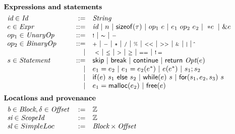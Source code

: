\begin{figure}[H]
    \[\def\arraystretch{1.00}
    {
    \begin{array}{lrl}
\multicolumn{3}{l}{\hspace{-5pt}\textbf{Expressions and statements}} \\[4pt]
    \Idvar \in \Id      & :=        & \textdom{String}                    \\
    e \in \Expr         & \bnfdef   & \Idvar \ | \ n \ | \ \mathconstr{sizeof}(\tau) \ | \ op_1  \ e \ | \ e_1 \ op_2 \ e_2 \ | \ \mathbin{*e} \ | \ \&e \   \\
    op_1 \in \textdom{UnaryOp}    & \bnfdef   & \smallbm{!} \  | \ \smallbm{\sim} \ | \ \smallbm{{-}}            \\
    op_2 \in \textdom{BinaryOp}   & \bnfdef   & \smallbm{+} \  | \ \smallbm{-} \ | \ \smallbm{*} \ | \ \smallbm{/} \ | \ \smallbm{\%} \ | \ \smallbm{<<} \ | \ \smallbm{>>} \ | \ \smallbm{\&} \ | \ \smallbm{|} \ | \ \smallbm{\hat{}}  \ \\
                                  & |         & \ \smallbm{<}  \ | \ \smallbm{\leq} \ | \ \smallbm{>} \ | \ \smallbm{\geq} \ | \ \smallbm{==} \ | \ \smallbm{!=}     \\
    s \in \Statement    & \bnfdef   & \mathsf{skip}  \ | \ \mathsf{break} \ | \ \mathsf{continue} \ | \  \mathsf{return} \ \Optiontype{e}                                            \\
                            & |         & e_1 = e_2 \ | \ e_1 = e_2(e^*) \ | \ e(e^*) \ | \ s_1; s_2                                                    \\
                            & |         & \mathsf{if}(e) \ s_1 \ \mathsf{else} \ s_2  \ | \ \mathsf{while}(e) \ s  \ | \ \mathsf{for}(s_1, e_2, s_3) \ s                           \\
                            & |         & e_1 = \mathsf{malloc}(e_2)  \ | \ \mathsf{free}(e)                                          \\[6pt]
\multicolumn{3}{l}{\hspace{-5pt}\textbf{Locations and provenance}} \\[4pt]
    \Blockvar \in \Block, \delta \in \Offset    & :=        & \mathbb{Z}    \\
    \Scopeidvar \in \Scopeid                    & :=        & \mathbb{Z}    \\
    \Simplelocvar \in SimpleLoc             & :=        & \Block \times \Offset                 \\

\end{array}}\]
\end{figure}

